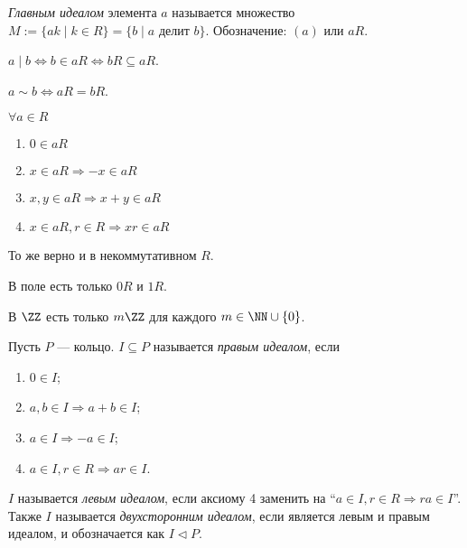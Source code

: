 \documentclass[12pt,a4paper]{article}
\begin{document}
    \begin{definition}
        \emph{Главным идеалом} элемента $a$ называется множество $M := \{ak \mid k \in R\} = \{b \mid a \text{ делит } b\}$. Обозначение: $(a)$ или $aR$.
    \end{definition}

    \begin{statement}
        $a \mid b \Leftrightarrow b \in aR \Leftrightarrow bR \subseteq aR$. 
    \end{statement}

    \begin{statement}
        $a \sim b \Leftrightarrow aR = bR$.
    \end{statement}

    \begin{statement}$\forall a \in R$
        \begin{enumerate}
            \item $0 \in aR$
            \item $x \in aR \Rightarrow -x \in aR$
            \item $x, y \in aR \Rightarrow x + y \in aR$
            \item $x \in aR, r \in R \Rightarrow xr \in aR$
        \end{enumerate}
    \end{statement}

    \begin{remark}
        То же верно и в некоммутативном $R$.
    \end{remark}

    \begin{example}
        В поле есть только $0R$ и $1R$.
    \end{example}

    \begin{example}
        В $\ZZ$ есть только $m\ZZ$ для каждого $m \in \NN \cup \{0\}$.
    \end{example}

    \begin{definition}
        Пусть $P$ --- кольцо. $I\subseteq P$ называется \emph{правым идеалом}, если
        \begin{enumerate}
            \item $0 \in I$;
            \item $a, b \in I \Rightarrow a + b \in I$;
            \item $a \in I \Rightarrow -a \in I$;
            \item $a \in I, r \in R \Rightarrow ar \in I$.
        \end{enumerate}
        $I$ называется \emph{левым идеалом}, если аксиому 4 заменить на ``$a \in I, r \in R \Rightarrow ra \in I$''. Также $I$ называется \emph{двухсторонним идеалом}, если является левым и правым идеалом, и обозначается как $I \triangleleft P$.
    \end{definition}
\end{document}
